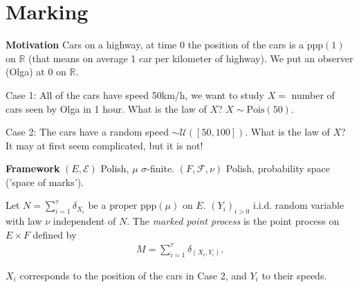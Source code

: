 \section{Marking}
\noindent
\textbf{Motivation} Cars on a highway, at time 0 the position of the cars is a ppp$(1)$ on $\mathbb{R}$ (that means on average 1 car per kilometer of highway). We put an observer (Olga) at 0 on $\mathbb{R}$.

Case 1: All of the cars have speed 50km/h, we want to study $X=$ number of cars seen by Olga in 1 hour. What is the law of $X$? $X \sim \textrm{Pois}(50)$.

Case 2: The cars have a random speed $ \sim \mathcal{U}([50,100]) $. What is the law of $X$? It may at first seem complicated, but it is not!

\noindent
\textbf{Framework} $(E, \mathcal{E})$ Polish, $\mu$ $\sigma$-finite. $(F, \mathcal{F}, \nu )$ Polish, probability space ('space of marks').
\begin{defn}
	Let $N=\sum_{i=1}^{\tau} \delta_{X_i}$ be a proper ppp$(\mu)$ on $E$. $(Y_i)_{i> 0}$ i.i.d. random variable with law $\nu $ independent of $N$. The \emph{marked point process} is the point process on $E \times F$ defined by 
	\begin{align}
	\boxed{M=\sum_{i=1}^{\tau} \delta_{(X_i, Y_i)}.}
	\end{align}
\end{defn}

\begin{rmk}[]
	$X_i$ corresponds to the position of the cars in Case 2, and $Y_i$ to their speeds.
\end{rmk}


